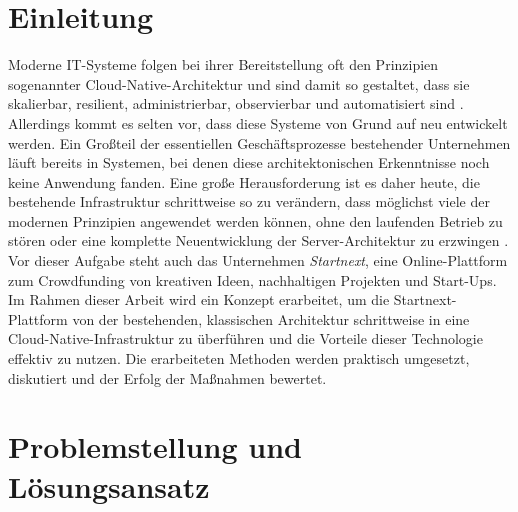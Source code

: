 \documentclass[11pt]{scrartcl}
\begin{document}
\section{Einleitung}

Moderne IT-Systeme folgen bei ihrer Bereitstellung %
oft den Prinzipien sogenannter Cloud-Native-Architektur und sind damit so gestaltet, dass sie skalierbar, resilient, administrierbar, observierbar und automatisiert sind \cite{Lee:2021}. 
Allerdings kommt es selten vor, dass diese Systeme von Grund auf neu entwickelt werden. Ein Großteil der essentiellen Geschäftsprozesse bestehender Unternehmen läuft bereits in Systemen, bei denen diese architektonischen Erkenntnisse noch keine Anwendung fanden. Eine große Herausforderung ist es daher heute, die bestehende Infrastruktur schrittweise so zu verändern, dass möglichst viele der modernen Prinzipien angewendet werden können, ohne den laufenden Betrieb zu stören oder eine komplette Neuentwicklung der Server-Architektur zu erzwingen \cite{Fiedelholtz:2021}. %
Vor dieser Aufgabe steht auch das Unternehmen \textit{Startnext}, eine Online-Plattform zum Crowdfunding von kreativen Ideen, nachhaltigen Projekten und Start-Ups. Im Rahmen dieser Arbeit wird ein Konzept erarbeitet, um die Startnext-Plattform von der bestehenden, klassischen Architektur schrittweise in eine Cloud-Native-Infrastruktur zu überführen und die Vorteile dieser Technologie %
effektiv zu nutzen. Die erarbeiteten Methoden werden praktisch umgesetzt, diskutiert und der Erfolg der Maßnahmen bewertet.

\section{\label{sec:problem_loesung}Problemstellung und Lösungsansatz}
\end{document}
